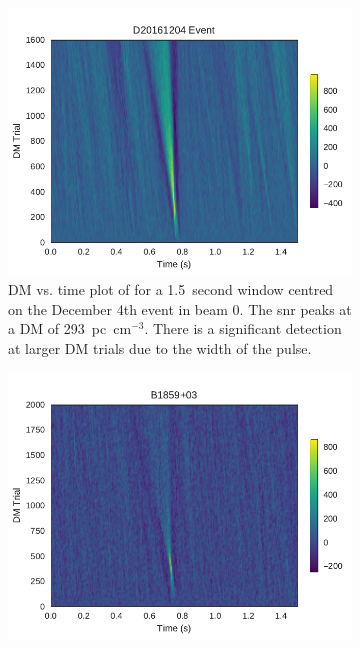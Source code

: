 \documentclass[a4paper,fleqn,usenatbib]{mnras}
\begin{document}
\begin{figure}
    \centering
    \begin{subfigure}[t]{0.5\textwidth}
        \centering\captionsetup{width=.95\linewidth}
        \includegraphics[width=1.0\textwidth]{figures/D20161204_dmtrials_buf23_Beam0.pdf}
        \caption{DM vs. time plot of for a 1.5~second window centred on the
        December 4th event in beam 0. The \gls{snr} peaks at a DM of
        293~pc~cm$^{-3}$. There is a significant detection at larger DM trials
        due to the width of the pulse.
        }
        \label{fig:dm_time_event}
    \end{subfigure}
    \begin{subfigure}[t]{0.5\textwidth}
        \centering\captionsetup{width=.95\linewidth}
        \includegraphics[width=1.0\textwidth]{figures/B1859_dmtrials.pdf}

\end{subfigure}
\end{figure}
\end{document}
